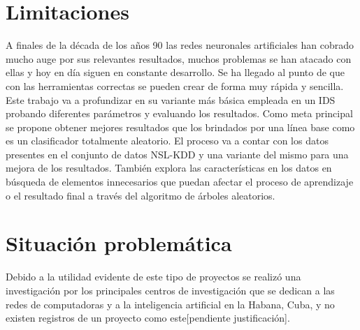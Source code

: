 \section*{Limitaciones}
A finales de la década de los años 90 las redes neuronales artificiales han cobrado mucho auge por sus relevantes resultados, muchos problemas se han atacado con ellas y hoy en día siguen en constante desarrollo. Se ha llegado al punto de que con las herramientas correctas se pueden crear de forma muy rápida y sencilla. Este trabajo va a profundizar en su variante más básica empleada en un IDS probando diferentes parámetros y evaluando los resultados. Como meta principal se propone obtener mejores resultados que los brindados por una línea base como es un clasificador totalmente aleatorio. El proceso va a contar con los datos presentes en el conjunto de datos NSL-KDD y una variante del mismo para una mejora de los resultados. También explora las características en los datos en búsqueda de elementos innecesarios que puedan afectar el proceso de aprendizaje o el resultado final a través del algoritmo de árboles aleatorios.

\section*{Situación problemática}
Debido a la utilidad evidente de este tipo de proyectos se realizó una investigación por los principales centros de investigación que se dedican a las redes de computadoras y a la inteligencia artificial en la Habana, Cuba, y no existen registros de un proyecto como este[pendiente justificación]. 

